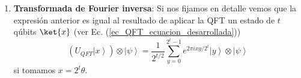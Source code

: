 \documentclass[a4paper,11pt]{book} %
\numberwithin{equation}{chapter}
\def\Lc{\Bigl[}
\def\Rc{\Bigr]}
\begin{document}
\begin{enumerate}
Como $U$ es unitaria y $\left| \psi \right\rangle$ es autovector de $U$, aplicar $2^{j}$ veces $U$ se traduce en:
$$
U^{2^{j}} \left| \psi \right\rangle = U^{2^{j}-1} U \left| \psi \right\rangle = U^{2^{j}-1} e^{2 \pi i \theta} \left| \psi \right\rangle = \dots = e^{2 \pi i 2^j \theta} \left| \psi \right\rangle
$$
Usando la relación 
	\begin{align*}
	CU \Lc \left( \left| 0 \right\rangle + \left| 1 \right\rangle \right) \otimes \left| \psi \right\rangle \Rc & =
	CU \Lc \ket{0} \otimes \ket{\psi} + \ket{1} \otimes \ket{\psi} \Rc \\
& = \left| 0 \right\rangle \otimes \left | \psi \right\rangle + \left| 1 \right\rangle \otimes e^{2 \pi i \theta} \left | \psi \right\rangle  \\
& = \left( \left| 0 \right\rangle + e^{2 \pi i \theta} \left| 1 \right\rangle \right) \otimes \left| \psi \right\rangle \,  ,
	\end{align*}
llegamos a
\begin{align*} 
|\Psi_{2}\rangle & =\frac {1}{2^{t/2}} \left(|0\rangle+{e^{{2\pi i} \theta 2^{t-1}}}|1\rangle \right) \otimes \cdots \otimes \left(|0\rangle+{e^{{2\pi i} \theta 2^{1}}}\vert1\rangle \right) \otimes \left(|0\rangle+{e^{2\pi i \theta 2^{0}}}\vert1\rangle \right) \otimes |\psi\rangle \\ 
& = \frac{1}{2^{n/2}}\sum_{y=0}^{2^{t}-1}e^{2\pi i \theta y}|y\rangle \otimes \vert\psi\rangle 
\end{align*}



\begin{mybox_blue}{Nota}
Podemos ver que si por el registro de conteo entra un estado $|z \rangle = | z_{n-1}, z_{n-2}, \dots, z_0 \rangle$, la salida antes de aplicar la QFT$^{-1}$ es de la forma
$$
|z \rangle |\psi \rangle \rightarrow |z \rangle U^{z_{t-1} 2^{t-1}} U^{z_{t-2}2^{t-2}} \dots U^{z_0 2^0} |\psi \rangle = | z \rangle U^{z}  |\psi \rangle
$$
Es decir, lo que se hace es aplicar $z$ veces el operador $U$ sobre el estado $|\psi \rangle$.

\end{mybox_blue}


	\item \textbf{Transformada de Fourier inversa}: Si nos fijamos en detalle vemos que la expresión anterior es igual al resultado de aplicar la QFT un estado de $t$ qúbits $\ket{x}$ (ver Ec. (\ref{ec_QFT_ecuacion_desarrollada}))
$$
\left( U_{QFT} \left| x \right\rangle \right) \otimes \left| \psi \right\rangle = \frac{1}{2^{t/2}} \sum_{y=0}^{2^t-1} e^{2 \pi i xy /2^t} \left| y \right\rangle \otimes \left| \psi \right\rangle 
$$
si tomamos $x = 2^t \theta$. 


\end{enumerate}
\end{document}
